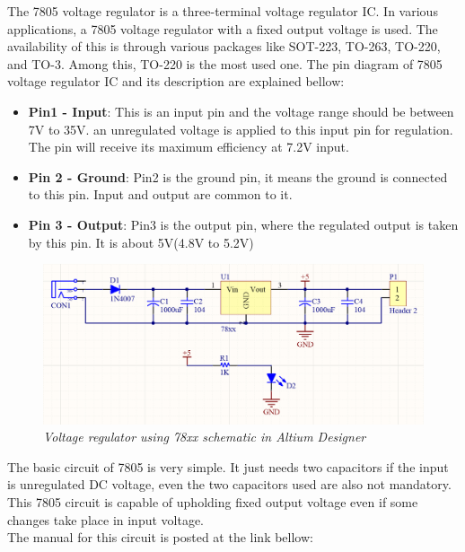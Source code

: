 The 7805 voltage regulator is a three-terminal voltage regulator IC. In various applications, a 7805 voltage regulator with a fixed output voltage is used. The availability of this is through various packages like SOT-223, TO-263, TO-220, and TO-3. Among this, TO-220 is the most used one. The pin diagram of 7805 voltage regulator IC and its description are explained bellow:
\begin{itemize}
    \item \textbf{Pin1 - Input}: This is an input pin and the voltage range should be between 7V to 35V. an unregulated voltage is applied to this input pin for regulation. The pin will receive its maximum efficiency at 7.2V input.
    \item \textbf{Pin 2 - Ground}: Pin2 is the ground pin, it means the ground is connected to this pin. Input and output are common to it.
    \item \textbf{Pin 3 - Output}: Pin3 is the output pin, where the regulated output is taken by this pin. It is about 5V(4.8V to 5.2V)
\end{itemize}

\begin{figure}[!htp]
    \centering
    \includegraphics[width=5in]{source/picture/bai_4/7805_SCH.PNG}
    \caption{\textit{Voltage regulator using 78xx schematic in Altium Designer}}
    \label{bai4_pic2}
\end{figure}

The basic circuit of 7805 is very simple. It just needs two capacitors if the input is unregulated DC voltage, even the two capacitors used are also not mandatory. This 7805 circuit is capable of upholding fixed output voltage even if some changes take place in input voltage.\\

The manual for this circuit is posted at the link bellow:
\begin{center}
\end{center}

